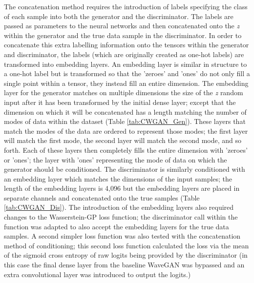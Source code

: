 \documentclass[a4paper, titlepage]{article}
\begin{document}
The concatenation method requires the introduction of labels specifying the class of each sample into both the generator and the discriminator.
The labels are passed as parameters to the neural networks and then concatenated onto the \textit{z} within the generator and the true data sample in the discriminator.
\newline
\newline
In order to concatenate this extra labelling information onto the tensors within the generator and discriminator, the labels (which are originally created as one-hot labels) are transformed into embedding layers.
An embedding layer is similar in structure to a one-hot label but is transformed so that the 'zeroes' and 'ones' do not only fill a single point within a tensor, they instead fill an entire dimension.
\newline
\newline
The embedding layer for the generator matches on multiple dimensions the size of the \textit{z} random input after it has been transformed by the initial dense layer; except that the dimension on which it will be concatenated has a length matching the number of modes of data within the dataset (Table \ref{tab:CWGAN_Gen}).
These layers that match the modes of the data are ordered to represent those modes; the first layer will match the first mode, the second layer will match the second mode, and so forth.
Each of these layers then completely fills the entire dimension with 'zeroes' or 'ones'; the layer with 'ones' representing the mode of data on which the generator should be conditioned.
\newline
\newline
The discriminator is similarly conditioned with an embedding layer which matches the dimensions of the input samples; the length of the embedding layers is 4,096 but the embedding layers are placed in separate channels and concatenated onto the true samples (Table \ref{tab:CWGAN_Dis}).
\newline
\newline
The introduction of the embedding layers also required changes to the Wasserstein-GP loss function; the discriminator call within the function was adapted to also accept the embedding layers for the true data samples.
\newline
\newline
A second simpler loss function was also tested with the concatenation method of conditioning; this second loss function calculated the loss via the mean of the sigmoid cross entropy of raw logits being provided by the discriminator (in this case the final dense layer from the baseline WaveGAN was bypassed and an extra convolutional layer was introduced to output the logits.)
\end{document}
